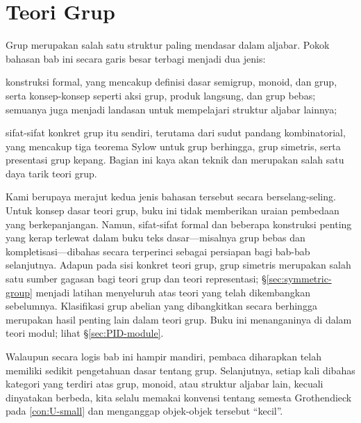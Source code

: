 
\chapter{Teori Grup}
Grup merupakan salah satu struktur paling mendasar dalam aljabar. Pokok bahasan bab ini secara garis besar terbagi menjadi dua jenis:
\begin{compactenum}
	\item konstruksi formal, yang mencakup definisi dasar semigrup, monoid, dan grup, serta konsep-konsep seperti aksi grup, produk langsung, dan grup bebas; semuanya juga menjadi landasan untuk mempelajari struktur aljabar lainnya;
	\item sifat-sifat konkret grup itu sendiri, terutama dari sudut pandang kombinatorial, yang mencakup tiga teorema Sylow untuk grup berhingga, grup simetris, serta presentasi grup kepang. Bagian ini kaya akan teknik dan merupakan salah satu daya tarik teori grup.
\end{compactenum}
Kami berupaya merajut kedua jenis bahasan tersebut secara berselang-seling. Untuk konsep dasar teori grup, buku ini tidak memberikan uraian pembedaan yang berkepanjangan. Namun, sifat-sifat formal dan beberapa konstruksi penting yang kerap terlewat dalam buku teks dasar---misalnya grup bebas dan kompletisasi---dibahas secara terperinci sebagai persiapan bagi bab-bab selanjutnya. Adapun pada sisi konkret teori grup, grup simetris merupakan salah satu sumber gagasan bagi teori grup dan teori representasi; \S\ref{sec:symmetric-group} menjadi latihan menyeluruh atas teori yang telah dikembangkan sebelumnya. Klasifikasi grup abelian yang dibangkitkan secara berhingga merupakan hasil penting lain dalam teori grup. Buku ini menanganinya di dalam teori modul; lihat \S\ref{sec:PID-module}.

Walaupun secara logis bab ini hampir mandiri, pembaca diharapkan telah memiliki sedikit pengetahuan dasar tentang grup. Selanjutnya, setiap kali dibahas kategori yang terdiri atas grup, monoid, atau struktur aljabar lain, kecuali dinyatakan berbeda, kita selalu memakai konvensi tentang semesta Grothendieck pada \ref{con:U-small} dan menganggap objek-objek tersebut ``kecil''.

